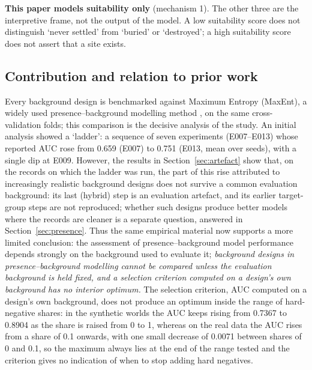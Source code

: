 \documentclass[12pt]{article}
\begin{document}
\textbf{This paper models suitability only} (mechanism 1).
The other three are the interpretive frame, not the output of the model.
A low suitability score does not distinguish `never settled' from `buried' or `destroyed'; a high suitability score does not assert that a site exists.

\subsection{Contribution and relation to prior work}

Every background design is benchmarked against Maximum Entropy (MaxEnt), a widely used presence--background modelling method \citep{elith2006}, on the same cross-validation folds; this comparison is the decisive analysis of the study.
An initial analysis showed a `ladder': a sequence of seven experiments (E007--E013) whose reported AUC rose from 0.659 (E007) to 0.751 (E013, mean over seeds), with a single dip at E009.
However, the results in Section~\ref{sec:artefact} show that, on the records on which the ladder was run, the part of this rise attributed to increasingly realistic background designs does not survive a common evaluation background: its last (hybrid) step is an evaluation artefact, and its earlier target-group steps are not reproduced; whether such designs produce better models where the records are cleaner is a separate question, answered in Section~\ref{sec:presence}.
Thus the same empirical material now supports a more limited conclusion: the assessment of presence--background model performance depends strongly on the background used to evaluate it; \emph{background designs in presence--background modelling cannot be compared unless the evaluation background is held fixed, and a selection criterion computed on a design's own background has no interior optimum.}
The selection criterion, AUC computed on a design's own background, does not produce an optimum inside the range of hard-negative shares: in the synthetic worlds the AUC keeps rising from 0.7367 to 0.8904 as the share is raised from 0 to 1, whereas on the real data the AUC rises from a share of 0.1 onwards, with one small decrease of 0.0071 between shares of 0 and 0.1, so the maximum always lies at the end of the range tested and the criterion gives no indication of when to stop adding hard negatives.
\end{document}
